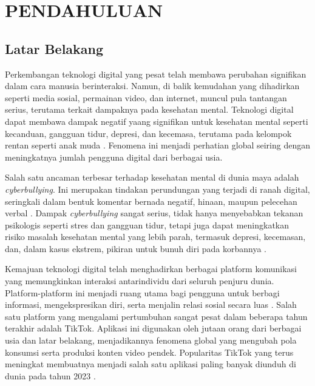 \newpage
\pagestyle{fancy}
\fancyhf{}
\fancyhead[R]{\thepage}
\chapter{PENDAHULUAN} \label{Bab I}

\section{Latar Belakang} \label{I.Latar Belakang}

Perkembangan teknologi digital yang pesat telah membawa perubahan signifikan dalam cara manusia berinteraksi. Namun, di balik kemudahan yang dihadirkan seperti media sosial, permainan video, dan internet, muncul pula tantangan serius, terutama terkait dampaknya pada kesehatan mental. Teknologi digital dapat membawa dampak negatif yaang signifikan untuk kesehatan mental seperti kecanduan, gangguan tidur, depresi, dan kecemasa, terutama pada kelompok rentan seperti anak muda \cite{sembiring2024dampak}. Fenomena ini menjadi perhatian global seiring dengan meningkatnya jumlah pengguna digital dari berbagai usia.

Salah satu ancaman terbesar terhadap kesehatan mental di dunia maya adalah \textit{cyberbullying}. Ini merupakan tindakan perundungan yang terjadi di ranah digital, seringkali dalam bentuk komentar bernada negatif, hinaan, maupun pelecehan verbal \cite{putri2023cyberbullying}. Dampak \textit{cyberbullying} sangat serius, tidak hanya menyebabkan tekanan psikologis seperti stres dan gangguan tidur, tetapi juga dapat meningkatkan risiko masalah kesehatan mental yang lebih parah, termasuk depresi, kecemasan, dan, dalam kasus ekstrem, pikiran untuk bunuh diri pada korbannya \cite{kurniawan2024dampak}.

Kemajuan teknologi digital telah menghadirkan berbagai platform komunikasi yang memungkinkan interaksi antarindividu dari seluruh penjuru dunia. Platform-platform ini menjadi ruang utama bagi pengguna untuk berbagi informasi, mengekspresikan diri, serta menjalin relasi sosial secara luas \cite{sari2018komunikasi}. Salah satu platform yang mengalami pertumbuhan sangat pesat dalam beberapa tahun terakhir adalah TikTok. Aplikasi ini digunakan oleh jutaan orang dari berbagai usia dan latar belakang, menjadikannya fenomena global yang mengubah pola konsumsi serta produksi konten video pendek. Popularitas TikTok yang terus meningkat membuatnya menjadi salah satu aplikasi paling banyak diunduh di dunia pada tahun 2023 \cite{rosiana2023analisis}.

